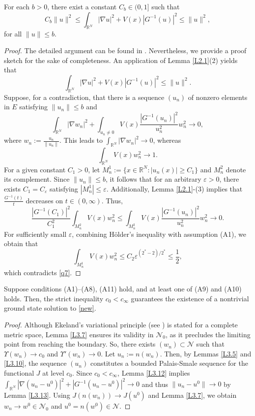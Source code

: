 \documentclass[reqno]{amsart}
\begin{document}
\begin{lemma}\label{L3.13} 
For each $b>0$,  there exist a constant $C_b \in(0,1]$ such that 
$$
C_b\|u\|^2\leq \int_{\mathbb{R}^N}|\nabla u|^2+V(x)|G^{-1}(u)|^2\leq\|u\|^2,
$$ 
for all $\|u\|\leq b$.
\end{lemma}

\begin{proof}
The detailed argument can be found in \cite[Lemma 3.2 ]{fang1}. 
Nevertheless, we provide a proof sketch for the sake of completeness. 
An application of Lemma \ref{L2.1}(2) yields that 
$$
\int_{\mathbb{R}^N}|\nabla u|^2+V(x)|G^{-1}(u)|^2\leq\|u\|^2.
$$
Suppose, for a contradiction, that there is a sequence $(u_n)$ of nonzero elements in $E$ 
satisfying $\|u_n\|\leq b$ and
\[
\int_{\mathbb{R}^N} |\nabla w_n|^2 + \int_{u_n \neq 0} V(x) \frac{|G^{-1}(u_n)|^2}{u_n^2} w_n^2 \to 0,
\]
where $w_n := \frac{u_n}{\|u_n\|}$. This leads to $\int_{\mathbb{R}^N} |\nabla w_n|^2 \to 0$, whereas
\begin{equation}
\label{q7}
\int_{\mathbb{R}^N} V(x) w_n^2 \to 1. 
\end{equation}
For a given constant $C_1 > 0$, let $M^1_n := \{ x \in \mathbb{R}^N : |u_n(x)| \geq C_1 \}$ 
and $M^2_n$ denote its complement. 
Since $\|u_n\|\leq b$,  it follows that for an arbitrary  $\varepsilon > 0$, 
there exists $C_1=C_\varepsilon$  satisfying $|M^1_n| \leq \varepsilon$. 
Additionally, Lemma \ref{L2.1}-(3) implies that $\frac{G^{-1}(t)}{t}$  decreases on $t \in(0,\infty)$. Thus,
\[
\frac{|G^{-1}(C_1)|^2}{C_1^2} \int_{M^2_n} V(x) w_n^2 \leq \int_{M^2_n} V(x) \frac{|G^{-1}(u_n)|^2}{u_n^2} w_n^2 \to 0.
\]
For sufficiently small $\varepsilon$,  combining H\"older's inequality with assumption (A1), 
we obtain that
\[
\int_{M^1_n} V(x) w_n^2 \leq C_2\varepsilon^{(2^*-2)/2^*} \leq \frac{1}{2},
\]
which contradicts \eqref{q7}. 
\end{proof}

\begin{proposition} \label{Pro1} 
Suppose conditions  {\rm (A1)--(A8), (A11) } hold, and at least one of {\rm (A9) }and {\rm (A10) }
holds. Then, the strict inequality \( c_0 < c_\infty \) guarantees the existence of a nontrivial ground state solution to \eqref{new}.
\end{proposition}

\begin{proof}
Although Ekeland's variational principle (see \cite[Theorem 4.8.1]{Chang}) is stated for 
a complete metric space, Lemma \ref{L3.7} ensures its validity in $\mathcal{N}_0$, 
as it precludes the limiting point from reaching the boundary.
So, there exists $(w_n)\subset\mathcal{N}$ such that $\Upsilon (w_n)\to c_0$ and 
$\Upsilon' (w_n)\to 0$. Let $u_n:=n(w_n)$.  Then, by Lemmas \ref{L3.5} and \ref{L3.10}, 
the sequence $(u_n)$ constitutes a bounded Palais-Smale sequence for the functional $J$ 
at level $c_0$. Since $c_0 < c_\infty$,  Lemma \ref{L3.12}  implies 
$\int_{\mathbb{R}^N}|\nabla(u_n-u^0)|^2+|G^{-1}(u_n-u^0)|^2\to0$ and thus 
$\|u_n-u^0\|\to0$ by Lemma \ref{L3.13}. Using $J(n(w_n))\to J(u^0)$ and Lemma \ref{L3.7}, 
we obtain $w_n\to w^0 \in \mathcal{N}_0$ and $u^0=n(w^0)\in\mathcal{N}$.
\end{proof}
\end{document}
